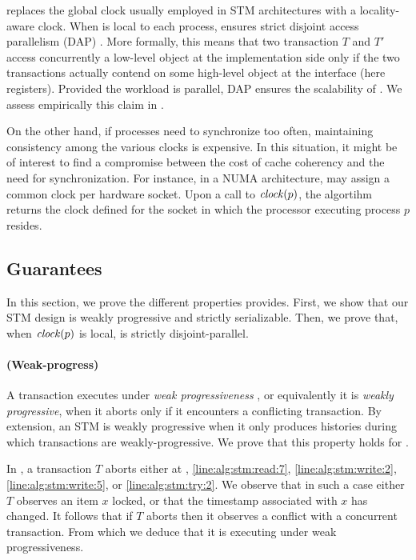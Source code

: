  replaces the global clock usually employed in STM architectures with a locality-aware clock.
When  is local to each process,  ensures strict disjoint access parallelism (DAP) \cite{Attiya2015}.
More formally, this means that two transaction $T$ and $T'$ access concurrently a low-level object at the implementation side only if the two transactions actually contend on some high-level object at the interface (here registers).
Provided the workload is parallel, DAP ensures the scalability of .
We assess empirically this claim in .

On the other hand, if processes need to synchronize too often, maintaining consistency among the various clocks is expensive.
In this situation, it might be of interest to find a compromise between the cost of cache coherency and the need for synchronization.
For instance, in a NUMA architecture,  may assign a common clock per hardware socket.
Upon a call to $\clockOf{p}$, the algortihm returns the clock defined for the socket in which the processor executing process $p$ resides.

\subsection{Guarantees}

In this section, we prove the different properties  provides.
First, we show that our STM design is weakly progressive and strictly serializable.
Then, we prove that, when $\clockOf{p}$ is local,  is strictly disjoint-parallel.

\paragraph{(Weak-progress)}
A transaction executes under \emph{weak progressiveness} \cite{Guerraoui:2009}, or equivalently it is \emph{weakly progressive}, when it aborts only if it encounters a conflicting transaction.
By extension, an STM is weakly progressive when it only produces histories during which transactions are weakly-progressive.
We prove that this property holds for .

In , a transaction $T$ aborts either at , \ref{line:alg:stm:read:7}, \ref{line:alg:stm:write:2}, \ref{line:alg:stm:write:5}, or \ref{line:alg:stm:try:2}.
We observe that in such a case either $T$ observes an item $x$ locked, or that the timestamp associated with $x$ has changed.
It follows that if $T$ aborts then it observes a conflict with a concurrent transaction.
From which we deduce that it is executing under weak progressiveness.

